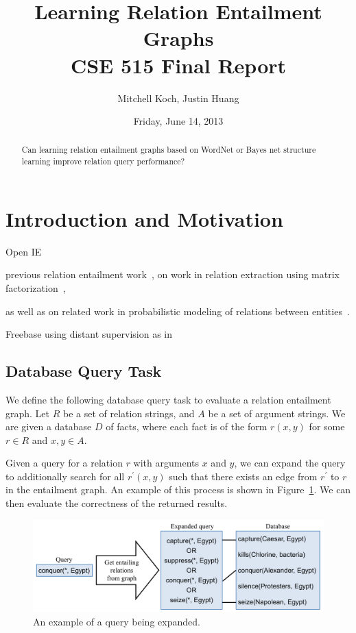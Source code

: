 \documentclass{article}
\author{Mitchell Koch, Justin Huang}
\title{Learning Relation Entailment Graphs\\CSE 515 Final Report}
\date{Friday, June 14, 2013}
\begin{document}
\maketitle

\begin{abstract}
Can learning relation entailment graphs based on WordNet or Bayes net
structure learning improve relation query performance?
\end{abstract}

\section{Introduction and Motivation}

Open IE~\cite{Etzioni:2008:OIE:1409360.1409378}

previous relation entailment
work~\cite{Berant:2012:LER:2122944.2122947, berant2011global}, on work in relation
extraction using matrix factorization~\cite{riedel13relation}, 

as well as on related work in probabilistic modeling of relations
between entities~\cite{TaskarWAK03, Taskar:2002:DPM:2073876.2073934}.

Freebase using distant supervision as in~\cite{HoffmannZLZW11}

\subsection{Database Query Task}
\label{database-query-task}
We define the following database query task to evaluate a relation entailment graph. Let $R$ be a set of relation strings, and $A$ be a set of argument strings. We are given a database $D$ of facts, where each fact is of the form $r(x, y)$ for some $r\in R$ and $x, y\in A$.

Given a query for a relation $r$ with arguments $x$ and $y$, we can expand the query to additionally search for all $r^\prime(x, y)$ such that there exists an edge from $r^\prime$ to $r$ in the entailment graph. An example of this process is shown in Figure~\ref{query-expansion}. We can then evaluate the correctness of the returned results.

\begin{figure}[h]
\begin{center}
\includegraphics[width=1.0\textwidth]{figures/query-expansion.pdf}
\end{center}
\caption{An example of a query being expanded.}\label{query-expansion}
\end{figure}
\end{document}
